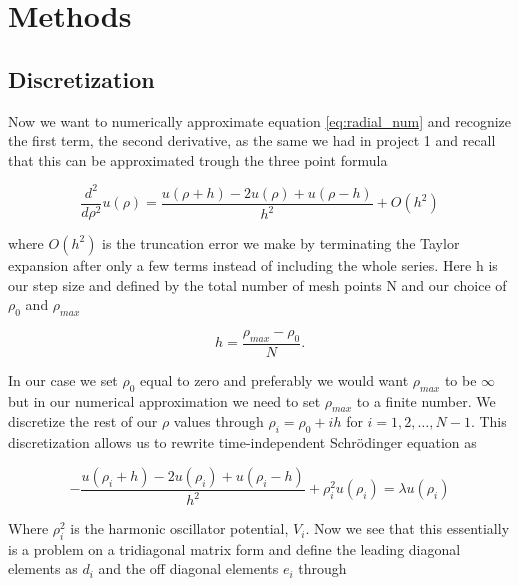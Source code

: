 \documentclass[12pt]{article}
\numberwithin{figure}{section}
\numberwithin{table}{section}
\begin{document}
\section{Methods}
\subsection{Discretization} \label{sec:discretization}


\noindent Now we want to numerically approximate equation \eqref{eq:radial_num} and recognize the first term, the second derivative, as the same we had in project 1 \cite{pro1} and recall that this can be approximated trough the three point formula \cite{Comp}

\begin{equation}
\label{eq:3point}
 \frac{d^2}{d\rho^2} u(\rho) = \frac{u(\rho+h) -2u(\rho) +u(\rho-h)}{h^2} +O(h^2)
\end{equation}

\noindent where $O(h^2)$ is the truncation error we make by terminating the Taylor expansion after only a few terms instead of including the whole series. Here h is our step size and defined by the total number of mesh points N and our choice of $\rho_0$ and $\rho_{max}$ \cite{Comp} 

\begin{equation}
\label{eq:h}
  h=\frac{\rho_{max}-\rho_0 }{N}.
\end{equation}

\noindent In our case we set $\rho_0$ equal to zero and preferably we would want $\rho_{max}$ to be $\infty$ but in our numerical approximation we need to set $\rho_{max}$ to a finite number. We discretize the rest of our $\rho$ values through $\rho_i= \rho_0 + ih$ for $i=1,2,\dots , N-1$. This discretization allows us to rewrite time-independent Schrödinger equation as \cite{pro2}

\begin{equation}
 -\frac{u(\rho_i+h) -2u(\rho_i) +u(\rho_i-h)}{h^2}+\rho_i^2u(\rho_i)  = \lambda u(\rho_i)
\end{equation}

\noindent Where $\rho_i ^2$ is the harmonic oscillator potential, $V_i$. Now we see that this essentially is a problem on a tridiagonal matrix form and define the leading diagonal elements as $d_i$ and the off diagonal elements $e_i$ through \cite{pro2}
\end{document}
